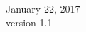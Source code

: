 \begin{titlepage}


{\large January 22, 2017}\\[0.5cm] %
{\large version 1.1}\\[2cm]
 

\vfill %
\clearpage
\end{titlepage}
